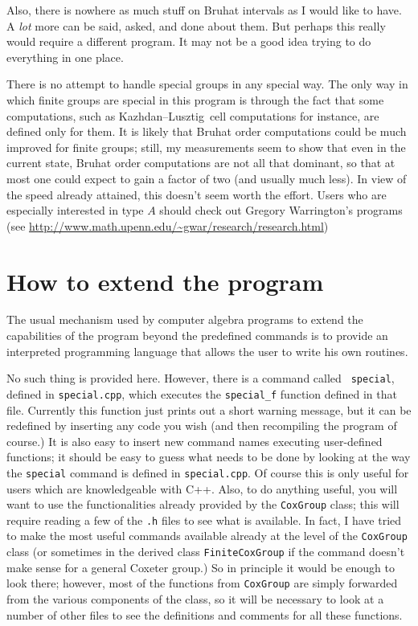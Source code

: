 \documentclass[11pt]{article}
\newcommand{\kl}{Kazh\-dan--Lusz\-tig}
\begin{document}
Also, there is nowhere as much stuff on Bruhat intervals as I would like to
have. A {\em lot} more can be said, asked, and done about them. But perhaps
this really would require a different program. It may not be a good idea trying
to do everything in one place.

There is no attempt to handle special groups in any special way. The only way
in which finite groups are special in this program is through the fact that
some computations, such as \kl\ cell computations for instance, are defined
only for them. It is likely that Bruhat order computations could be much 
improved for finite groups; still, my measurements seem to show that even in 
the current state, Bruhat order computations are not all that dominant, so that
at most one could expect to gain a factor of two (and usually much less). In
view of the speed already attained, this doesn't seem worth the effort. Users
who are especially interested in type $A$ should check out Gregory Warrington's
programs (see \url{http://www.math.upenn.edu/~gwar/research/research.html})

\section{How to extend the program}\label{section:extend}

The usual mechanism used by computer algebra programs to extend the
capabilities of the program beyond the predefined commands is to provide
an interpreted programming language that allows the user to write his own
routines.

No such thing is provided here. However, there is a command called {\tt 
special}, defined in {\tt special.cpp}, which executes the {\tt special\_f}
function defined in that file. Currently this function just prints out a
short warning message, but it can be redefined by inserting any code you
wish (and then recompiling the program of course.) It is also easy to
insert new command names executing user-defined functions; it should be
easy to guess what needs to be done by looking at the way the {\tt special}
command is defined in {\tt special.cpp}. Of course this is only useful for
users which are knowledgeable with C++. Also, to do anything useful, you
will want to use the functionalities already provided by the {\tt CoxGroup}
class; this will require reading a few of the {\tt .h} files to see what is
available. In fact, I have tried to make the most useful commands available
already at the level of the {\tt CoxGroup} class (or sometimes in the derived
class {\tt FiniteCoxGroup} if the command doesn't make sense for a general
Coxeter group.) So in principle it would be enough to look there; however,
most of the functions from {\tt CoxGroup} are simply forwarded from the
various components of the class, so it will be necessary to look at a number
of other files to see the definitions and comments for all these functions.
\end{document}
